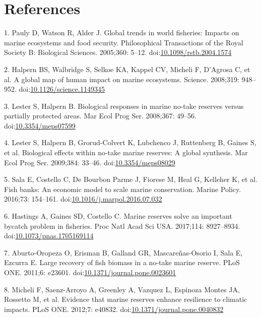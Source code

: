 \documentclass[12pt,]{article}
\begin{document}
\clearpage

\section{References}\label{references}

\hypertarget{refs}{}
\hypertarget{ref-pauly_2005-qV}{}
1. Pauly D, Watson R, Alder J. Global trends in world fisheries: Impacts
on marine ecosystems and food security. Philosophical Transactions of
the Royal Society B: Biological Sciences. 2005;360: 5--12.
doi:\href{https://doi.org/10.1098/rstb.2004.1574}{10.1098/rstb.2004.1574}

\hypertarget{ref-halpern_2008-dK}{}
2. Halpern BS, Walbridge S, Selkoe KA, Kappel CV, Micheli F, D'Agrosa C,
et al. A global map of human impact on marine ecosystems. Science.
2008;319: 948--952.
doi:\href{https://doi.org/10.1126/science.1149345}{10.1126/science.1149345}

\hypertarget{ref-lester_2008-F_}{}
3. Lester S, Halpern B. Biological responses in marine no-take reserves
versus partially protected areas. Mar Ecol Prog Ser. 2008;367: 49--56.
doi:\href{https://doi.org/10.3354/meps07599}{10.3354/meps07599}

\hypertarget{ref-lester_2009-Ks}{}
4. Lester S, Halpern B, Grorud-Colvert K, Lubchenco J, Ruttenberg B,
Gaines S, et al. Biological effects within no-take marine reserves: A
global synthesis. Mar Ecol Prog Ser. 2009;384: 33--46.
doi:\href{https://doi.org/10.3354/meps08029}{10.3354/meps08029}

\hypertarget{ref-sala_2016-PV}{}
5. Sala E, Costello C, De Bourbon Parme J, Fiorese M, Heal G, Kelleher
K, et al. Fish banks: An economic model to scale marine conservation.
Marine Policy. 2016;73: 154--161.
doi:\href{https://doi.org/10.1016/j.marpol.2016.07.032}{10.1016/j.marpol.2016.07.032}

\hypertarget{ref-hastings_2017-sm}{}
6. Hastings A, Gaines SD, Costello C. Marine reserves solve an important
bycatch problem in fisheries. Proc Natl Acad Sci USA. 2017;114:
8927--8934.
doi:\href{https://doi.org/10.1073/pnas.1705169114}{10.1073/pnas.1705169114}

\hypertarget{ref-aburtooropeza_2011-ya}{}
7. Aburto-Oropeza O, Erisman B, Galland GR, Mascareñas-Osorio I, Sala E,
Ezcurra E. Large recovery of fish biomass in a no-take marine reserve.
PLoS ONE. 2011;6: e23601.
doi:\href{https://doi.org/10.1371/journal.pone.0023601}{10.1371/journal.pone.0023601}

\hypertarget{ref-micheli_2012-EU}{}
8. Micheli F, Saenz-Arroyo A, Greenley A, Vazquez L, Espinoza Montes JA,
Rossetto M, et al. Evidence that marine reserves enhance resilience to
climatic impacts. PLoS ONE. 2012;7: e40832.
doi:\href{https://doi.org/10.1371/journal.pone.0040832}{10.1371/journal.pone.0040832}
\end{document}
